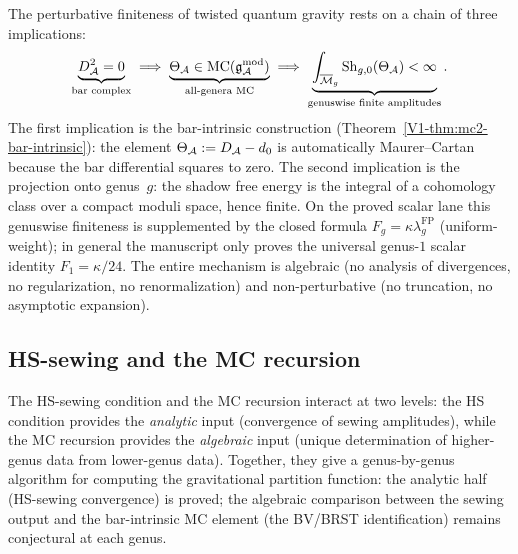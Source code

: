 \begin{remark}
The perturbative finiteness of twisted quantum gravity rests on a chain of three implications:
\begin{equation}%
\underbrace{D_\cA^2 = 0}_{\text{bar complex}} \;\Longrightarrow\; \underbrace{\Theta_\cA \in \mathrm{MC}(\gAmod)}_{\text{all-genera MC}} \;\Longrightarrow\; \underbrace{\int_{\overline{\mathcal{M}}_g}\operatorname{Sh}_{g,0}(\Theta_\cA) < \infty}_{\text{genuswise finite amplitudes}}.
\end{equation}
The first implication is the bar-intrinsic construction
\textup{(}Theorem~\ref*{V1-thm:mc2-bar-intrinsic}\textup{)}: the
element $\Theta_{\mathcal{A}} := D_{\mathcal{A}} - d_0$ is automatically Maurer--Cartan
because the bar differential squares to zero. The second implication
is the projection onto genus~$g$: the shadow free energy is the
integral of a cohomology class over a compact moduli space, hence
finite. On the proved scalar lane this genuswise finiteness is
supplemented by the closed formula
$F_g=\kappa\lambda_g^{\mathrm{FP}}$
\textup{(}uniform-weight\textup{)}; in general the manuscript only
proves the universal genus-$1$ scalar identity $F_1=\kappa/24$. The
entire mechanism is algebraic (no analysis of divergences, no
regularization, no renormalization) and non-perturbative (no
truncation, no asymptotic expansion).
\end{remark}



\subsection{HS-sewing and the MC recursion}

The HS-sewing condition and the MC recursion interact at two levels: the HS condition provides the \emph{analytic} input (convergence of sewing amplitudes), while the MC recursion provides the \emph{algebraic} input (unique determination of higher-genus data from lower-genus data). Together, they give a genus-by-genus algorithm for computing the gravitational partition function: the analytic half (HS-sewing convergence) is proved; the algebraic comparison between the sewing output and the bar-intrinsic MC element (the BV/BRST identification) remains conjectural at each genus.


